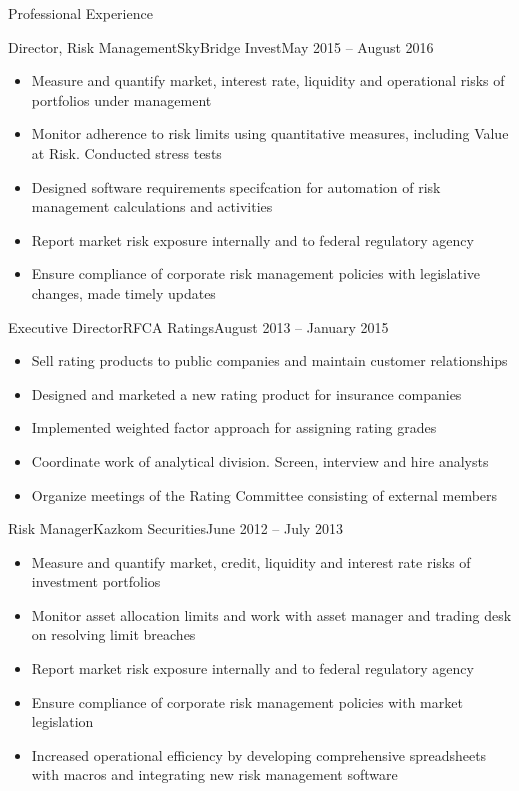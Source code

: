 \documentclass[]{mcdowellcv}
\begin{document}
\begin{cvsection}{Professional Experience}
  \begin{cvsubsection}{Director, Risk Management}{SkyBridge Invest}{May 2015 -- August 2016}		
    \begin{itemize}
      \item Measure and quantify market, interest rate, liquidity and operational risks of portfolios under management
      \item Monitor adherence to risk limits using quantitative measures, including Value at Risk. Conducted stress tests
      \item Designed software requirements specifcation for automation of risk management calculations and activities
      \item Report market risk exposure internally and to federal regulatory agency
      \item Ensure compliance of corporate risk management policies with legislative changes, made timely updates
    \end{itemize}
  \end{cvsubsection}

  \begin{cvsubsection}{Executive Director}{RFCA Ratings}{August 2013 -- January 2015}
    \begin{itemize}
      \item Sell rating products to public companies and maintain customer relationships
      \item Designed and marketed a new rating product for insurance companies
      \item Implemented weighted factor approach for assigning rating grades
      \item Coordinate work of analytical division. Screen, interview and hire analysts
      \item Organize meetings of the Rating Committee consisting of external members
    \end{itemize}
  \end{cvsubsection}

  \begin{cvsubsection}{Risk Manager}{Kazkom Securities}{June 2012 -- July 2013}
    \begin{itemize}
      \item Measure and quantify market, credit, liquidity and interest rate risks of investment portfolios
      \item Monitor asset allocation limits and work with asset manager and trading desk on resolving limit breaches
      \item Report market risk exposure internally and to federal regulatory agency
      \item Ensure compliance of corporate risk management policies with market legislation
      \item Increased operational efficiency by developing comprehensive spreadsheets with macros and integrating new risk management software
    \end{itemize}
  \end{cvsubsection}
\end{cvsection}
\end{document}
